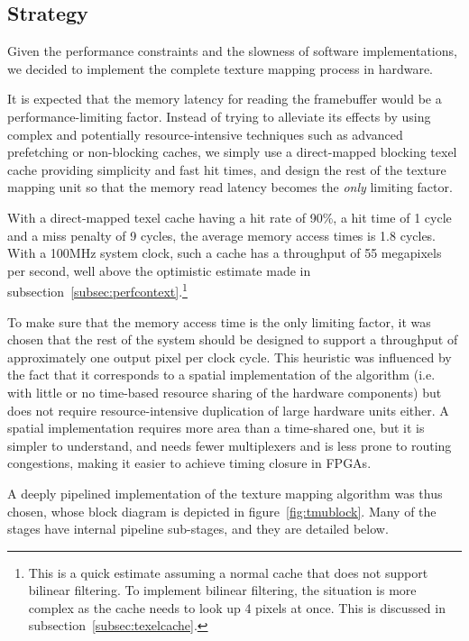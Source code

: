 \documentclass[a4paper,11pt]{kthesis}
\begin{document}
\subsection{Strategy}
\label{subsec:tmustrategy}
Given the performance constraints and the slowness of software implementations, we decided to implement the complete texture mapping process in hardware.

It is expected that the memory latency for reading the framebuffer would be a performance-limiting factor. Instead of trying to alleviate its effects by using complex and potentially resource-intensive techniques such as advanced prefetching or non-blocking caches, we simply use a direct-mapped blocking texel cache providing simplicity and fast hit times, and design the rest of the texture mapping unit so that the memory read latency becomes the \textit{only} limiting factor.

With a direct-mapped texel cache having a hit rate of 90\%, a hit time of 1 cycle and a miss penalty of 9 cycles, the average memory access times is 1.8 cycles. With a 100MHz system clock, such a cache has a throughput of 55 megapixels per second, well above the optimistic estimate made in subsection~\ref{subsec:perfcontext}.\footnote{This is a quick estimate assuming a normal cache that does not support bilinear filtering. To implement bilinear filtering, the situation is more complex as the cache needs to look up 4 pixels at once. This is discussed in subsection~\ref{subsec:texelcache}.}

To make sure that the memory access time is the only limiting factor, it was chosen that the rest of the system should be designed to support a throughput of approximately one output pixel per clock cycle. This heuristic was influenced by the fact that it corresponds to a spatial implementation of the algorithm (i.e. with little or no time-based resource sharing of the hardware components) but does not require resource-intensive duplication of large hardware units either. A spatial implementation requires more area than a time-shared one, but it is simpler to understand, and needs fewer multiplexers and is less prone to routing congestions, making it easier to achieve timing closure in FPGAs.

A deeply pipelined implementation of the texture mapping algorithm was thus chosen, whose block diagram is depicted in figure~\ref{fig:tmublock}. Many of the stages have internal pipeline sub-stages, and they are detailed below.
\end{document}
